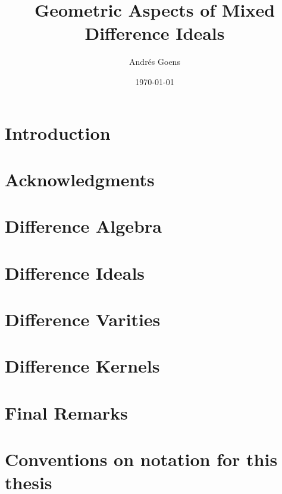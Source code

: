\documentclass[12pt,a4paper,BCOR15mm,twoside,DIV12]{article}
\title{Geometric Aspects of Mixed Difference Ideals}
\author{Andr\'{e}s Goens}
\date{\today}
\theoremstyle{plain}
\theoremstyle{definition}
\begin{document}
\setlength{\parindent}{1.5em}

\maketitle

\clearpage
\section*{Introduction}

\clearpage
\section*{Acknowledgments}

\clearpage

\tableofcontents

\clearpage 


\section{Difference Algebra}

\clearpage 
\section{Difference Ideals}



\clearpage 

\section{Difference Varities}

\clearpage 
\section{Difference Kernels}


\clearpage

\section{Final Remarks}

\clearpage

\begin{appendices}

\end{appendices}

\clearpage 


\clearpage
\section*{Conventions on notation for this thesis} 


\clearpage
\printindex
\end{document}

